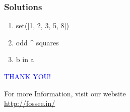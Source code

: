 \documentclass[presentation]{beamer}
\begin{document}
\begin{frame}
\frametitle{Solutions}
\label{sec-7}


\begin{enumerate}
\item set([1, 2, 3, 5, 8])
\vspace{12pt}
\item odd \^{} squares
\vspace{12pt}
\item b in a
\end{enumerate}
\end{frame}
\begin{frame}

  \begin{block}{}
  \begin{center}
  \textcolor{blue}{\Large THANK YOU!} 
  \end{center}
  \end{block}
\begin{block}{}
  \begin{center}
    For more Information, visit our website\\
    \url{http://fossee.in/}
  \end{center}  
  \end{block}
\end{frame}
\end{document}
